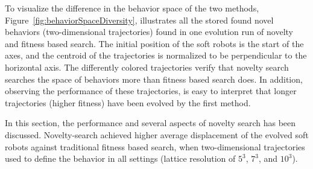 To visualize the difference in the behavior space of the two methods, Figure~\ref{fig:behaviorSpaceDiversity}, illustrates all the stored found novel behaviors (two-dimensional trajectories) found in one evolution run of novelty and fitness based search. The initial position of the soft robots is the start of the axes, and the centroid of the trajectories is normalized to be perpendicular to the horizontal axis. The differently colored trajectories verify that novelty search searches the space of behaviors more than fitness based search does. In addition, observing the performance of these trajectories, is easy to interpret that longer trajectories (higher fitness) have been evolved by the first method. 

In this section, the performance and several aspects of novelty search has been discussed. Novelty-search achieved higher average displacement of the evolved soft robots against traditional fitness based search, when two-dimensional trajectories used to define the behavior in all settings (lattice resolution of $5^3$, $7^3$, and $10^3$).


